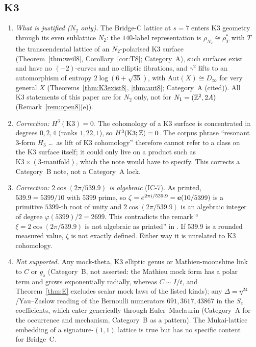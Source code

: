 \subsection{K3}\label{sec:rev8K3impl}
\begin{enumerate}[label=(\alph*),leftmargin=2em]
\item \emph{What is justified ($N_2$ only).} The Bridge-C lattice at $s=7$ enters K3 geometry through its even sublattice $N_2$: the $140$-label representation is $\rho_{N_2}\cong\rho_T^*$ with $T$ the transcendental lattice of an $N_2$-polarised K3 surface (Theorem~\ref{thm:weil8}, Corollary~\ref{cor:T8}; Category~A), such surfaces exist and have no $(-2)$-curves and no elliptic fibrations, and $\gamma^2$ lifts to an automorphism of entropy $2\log(6+\sqrt{35})$, with $\mathrm{Aut}(X)\cong D_\infty$ for very general $X$ (Theorems~\ref{thm:K3exist8}, \ref{thm:aut8}; Category~A (cited)). All K3 statements of this paper are for $N_2$ only, not for $N_1=(\mathbb{Z}^2,2A)$ (Remark~\ref{rem:open8}(e)).
\item \emph{Correction: $H^3(\mathrm{K3})=0$.} The cohomology of a K3 surface is concentrated in degrees $0,2,4$ (ranks $1,22,1$), so $H^3(\mathrm{K3};\mathbb{Z})=0$. The corpus phrase ``resonant 3-form $H_3$ \dots\ as lift of K3 cohomology'' therefore cannot refer to a class on the K3 surface itself; it could only live on a product such as $\mathrm{K3}\times(\text{3-manifold})$, which the note would have to specify. This corrects a Category~B note, not a Category~A lock.
\item \emph{Correction: $2\cos(2\pi/539.9)$ is algebraic} (IC-7). As printed, $539.9=5399/10$ with $5399$ prime, so $\zeta=e^{2\pi i/539.9}=\mathbf{e}(10/5399)$ is a primitive $5399$-th root of unity and $2\cos(2\pi/539.9)$ is an algebraic integer of degree $\varphi(5399)/2=2699$. This contradicts the remark ``$\xi=2\cos(2\pi/539.9)$ is not algebraic as printed'' in . If $539.9$ is a rounded measured value, $\zeta$ is not exactly defined. Either way it is unrelated to K3 cohomology.
\item \emph{Not supported.} Any mock-theta, K3 elliptic genus or Mathieu-moonshine link to $C$ or $g_s$ (Category~B, not asserted: the Mathieu mock form has a polar term and grows exponentially radially, whereas $C\sim I/t$, and Theorem~\ref{thm:E} excludes scalar mock laws of the listed kinds); any $\Delta=\eta^{24}$/Yau--Zaslow reading of the Bernoulli numerators $691,3617,43867$ in the $S_e$ coefficients, which enter generically through Euler--Maclaurin (Category~A for the occurrence and mechanism, Category~B as a pattern). The Mukai-lattice embedding of a signature-$(1,1)$ lattice is true but has no specific content for Bridge~C.
\end{enumerate}
